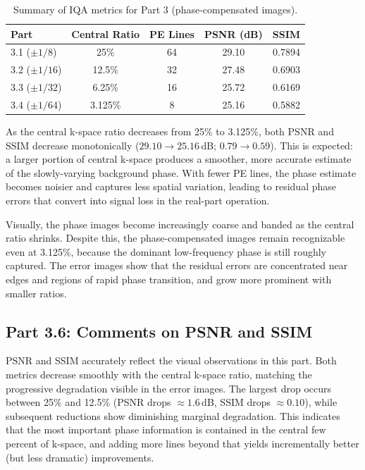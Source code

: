 \documentclass[12pt]{article}
\begin{document}
\begin{table}[H]
\centering
\begin{tabular}{|l|c|c|c|c|}
\hline
\textbf{Part} & \textbf{Central Ratio} & \textbf{PE Lines} & \textbf{PSNR (dB)} & \textbf{SSIM} \\
\hline
3.1 ($\pm 1/8$) & 25\% & 64 & 29.10 & 0.7894 \\
3.2 ($\pm 1/16$) & 12.5\% & 32 & 27.48 & 0.6903 \\
3.3 ($\pm 1/32$) & 6.25\% & 16 & 25.72 & 0.6169 \\
3.4 ($\pm 1/64$) & 3.125\% & 8 & 25.16 & 0.5882 \\
\hline
\end{tabular}
\caption{Summary of IQA metrics for Part 3 (phase-compensated images).}
\label{tab:p3_iqa}
\end{table}

As the central k-space ratio decreases from 25\% to 3.125\%, both PSNR and SSIM decrease monotonically ($29.10 \to 25.16$\,dB; $0.79 \to 0.59$). This is expected: a larger portion of central k-space produces a smoother, more accurate estimate of the slowly-varying background phase. With fewer PE lines, the phase estimate becomes noisier and captures less spatial variation, leading to residual phase errors that convert into signal loss in the real-part operation.

Visually, the phase images become increasingly coarse and banded as the central ratio shrinks. Despite this, the phase-compensated images remain recognizable even at 3.125\%, because the dominant low-frequency phase is still roughly captured. The error images show that the residual errors are concentrated near edges and regions of rapid phase transition, and grow more prominent with smaller ratios.

\subsection{Part 3.6: Comments on PSNR and SSIM}

PSNR and SSIM accurately reflect the visual observations in this part. Both metrics decrease smoothly with the central k-space ratio, matching the progressive degradation visible in the error images. The largest drop occurs between 25\% and 12.5\% (PSNR drops $\approx 1.6$\,dB, SSIM drops $\approx 0.10$), while subsequent reductions show diminishing marginal degradation. This indicates that the most important phase information is contained in the central few percent of k-space, and adding more lines beyond that yields incrementally better (but less dramatic) improvements.
\end{document}

